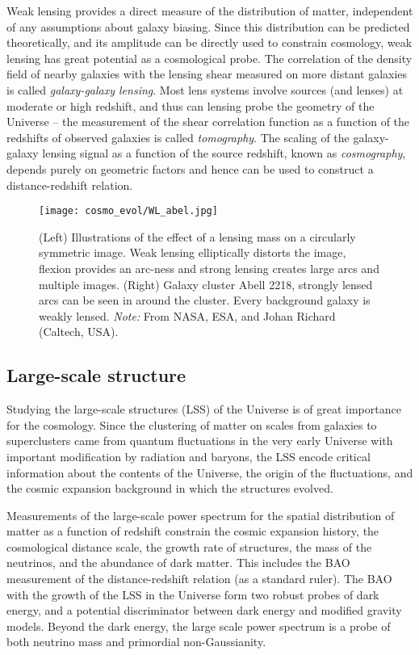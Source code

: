 Weak lensing provides a direct measure of the distribution of matter, independent of any assumptions about galaxy biasing. Since this distribution can be predicted theoretically, and its amplitude can be directly used to constrain cosmology, weak lensing has great potential as a cosmological probe. The correlation of the density field of nearby galaxies with the lensing shear measured on more distant galaxies is called \textit{galaxy-galaxy lensing}. Most lens systems involve sources (and lenses) at moderate or high redshift, and thus can lensing probe the geometry of the Universe -- the measurement of the shear correlation function as a function of the redshifts of observed galaxies is called \textit{tomography}. The scaling of the galaxy-galaxy lensing signal as a function of the source redshift, known as \textit{cosmography}, depends purely on geometric factors and hence can be used to construct a distance-redshift relation.
\begin{figure}[!hbt]
	\centering
		\texttt{[image: cosmo\_evol/WL\_abel.jpg]}
	\caption{(Left) Illustrations of the effect of a lensing mass on a circularly symmetric image. Weak lensing elliptically distorts the image, flexion provides an arc-ness and strong lensing creates large arcs and multiple images. (Right) Galaxy cluster Abell 2218, strongly lensed arcs can be seen in around the cluster. Every background galaxy is weakly lensed. \textit{Note:} From NASA, ESA, and Johan Richard (Caltech, USA).}
	\label{fig_WL_Abell}
\end{figure}
\subsection{Large-scale structure}
Studying the large-scale structures (LSS) of the Universe is of great importance for the cosmology. Since the clustering of matter on scales from galaxies to superclusters came from quantum fluctuations in the very early Universe with important modification by radiation and baryons, the LSS encode critical information about the contents of the Universe, the origin of the fluctuations, and the cosmic expansion background in which the structures evolved.

Measurements of the large-scale power spectrum for the spatial distribution of matter as a function of redshift constrain the cosmic expansion history, the cosmological distance scale, the growth rate of structures, the mass of the neutrinos, and the abundance of dark matter. This includes the BAO measurement of the distance-redshift relation (as a standard ruler). The BAO with the growth of the LSS in the Universe form two robust probes of dark energy, and a potential discriminator between dark energy and modified gravity models. Beyond the dark energy, the large scale power spectrum is a probe of both neutrino mass and primordial non-Gaussianity.
